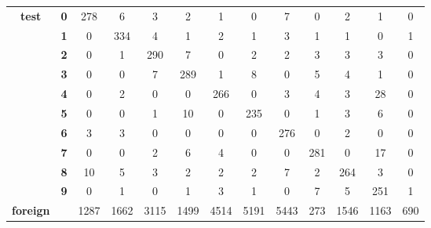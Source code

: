 \begin{table}[htp]
\begin{tabular}{|c|c|c|c|c|c|c|c|c|c|c|c|c|}
		\multirow{10}{*}{\textbf{test}}     & \textbf{0} & 278        & 6          & 3          & 2          & 1          & 0          & 7          & 0          & 2          & 1          & 0                \\ \cline{2-13} 
		& \textbf{1} & 0          & 334        & 4          & 1          & 2          & 1          & 3          & 1          & 1          & 0          & 1                \\ \cline{2-13} 
		& \textbf{2} & 0          & 1          & 290        & 7          & 0          & 2          & 2          & 3          & 3          & 3          & 0                \\ \cline{2-13} 
		& \textbf{3} & 0          & 0          & 7          & 289        & 1          & 8          & 0          & 5          & 4          & 1          & 0                \\ \cline{2-13} 
		& \textbf{4} & 0          & 2          & 0          & 0          & 266        & 0          & 3          & 4          & 3          & 28         & 0                \\ \cline{2-13} 
		& \textbf{5} & 0          & 0          & 1          & 10         & 0          & 235        & 0          & 1          & 3          & 6          & 0                \\ \cline{2-13} 
		& \textbf{6} & 3          & 3          & 0          & 0          & 0          & 0          & 276        & 0          & 2          & 0          & 0                \\ \cline{2-13} 
		& \textbf{7} & 0          & 0          & 2          & 6          & 4          & 0          & 0          & 281        & 0          & 17         & 0                \\ \cline{2-13} 
		& \textbf{8} & 10         & 5          & 3          & 2          & 2          & 2          & 7          & 2          & 264        & 3          & 0                \\ \cline{2-13} 
		& \textbf{9} & 0          & 1          & 0          & 1          & 3          & 1          & 0          & 7          & 5          & 251        & 1                \\ \hline
		\textbf{foreign}                    & \textbf{}  & 1287       & 1662       & 3115       & 1499       & 4514       & 5191       & 5443       & 273        & 1546       & 1163       & 690              \\ \hline
	\end{tabular}
\end{table}

